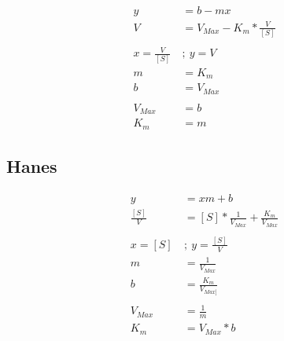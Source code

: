 \begin{align*}
    y &= b - mx
    \\
    V  &= V_{Max} - K_{m} * \frac{V}{[S]}
    \\
    \\
    x = \frac{V}{[S]} \ &; \ y = V
    \\
    m &= K_{m}
    \\
    b &= V_{Max}
    \\
    \\
    V_{Max} &= b
    \\
    K_{m} &= m
\end{align*}

\subsection{Hanes}

\begin{align*}
    y &= xm+b
    \\
    \frac{[S]}{V}  &= [S] * \frac{1}{V_{Max}} + \frac{K_{m}}{V_{Max}}
    \\
    \\
    x = [S] \ &; \ y = \frac{[S]}{V}
    \\
    m &= \frac{1}{V_{Max}}
    \\
    b &= \frac{K_{m}}{V_{Max]}}
    \\
    \\
    V_{Max} &= \frac{1}{m}
    \\
    K_{m} &= V_{Max} * b
\end{align*}

